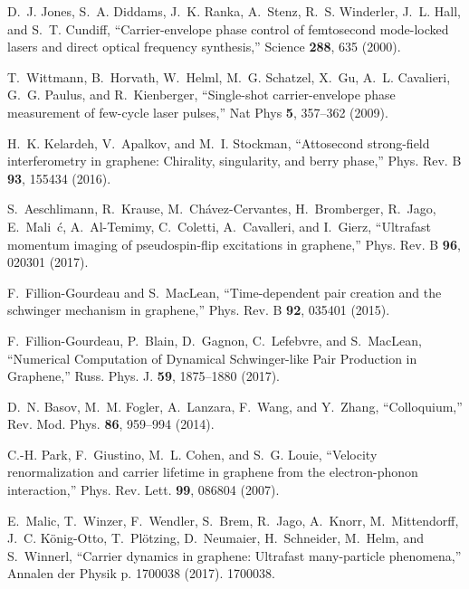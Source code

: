 \documentclass[9pt,twocolumn,twoside]{osajnl}
\begin{document}
\begin{thebibliography}{10}
D.~J. Jones, S.~A. Diddams, J.~K. Ranka, A.~Stenz, R.~S. Winderler, J.~L. Hall,
  and S.~T. Cundiff, \enquote{Carrier-envelope phase control of femtosecond
  mode-locked lasers and direct optical frequency synthesis,} Science
  \textbf{288}, 635 (2000).

T.~Wittmann, B.~Horvath, W.~Helml, M.~G. Schatzel, X.~Gu, A.~L. Cavalieri,
  G.~G. Paulus, and R.~Kienberger, \enquote{Single-shot carrier-envelope phase
  measurement of few-cycle laser pulses,} Nat Phys \textbf{5}, 357--362 (2009).

H.~K. Kelardeh, V.~Apalkov, and M.~I. Stockman, \enquote{Attosecond
  strong-field interferometry in graphene: Chirality, singularity, and berry
  phase,} Phys. Rev. B \textbf{93}, 155434 (2016).

S.~Aeschlimann, R.~Krause, M.~Ch\'avez-Cervantes, H.~Bromberger, R.~Jago,
  E.~Mali\ifmmode~\else \'{c}\fi{}, A.~Al-Temimy, C.~Coletti,
  A.~Cavalleri, and I.~Gierz, \enquote{Ultrafast momentum imaging of
  pseudospin-flip excitations in graphene,} Phys. Rev. B \textbf{96}, 020301
  (2017).

F.~Fillion-Gourdeau and S.~MacLean, \enquote{Time-dependent pair creation and
  the schwinger mechanism in graphene,} Phys. Rev. B \textbf{92}, 035401
  (2015).

F.~Fillion-Gourdeau, P.~Blain, D.~Gagnon, C.~Lefebvre, and S.~MacLean,
  \enquote{{Numerical Computation of Dynamical Schwinger-like Pair Production
  in Graphene},} Russ. Phys. J. \textbf{59}, 1875--1880 (2017).

D.~N. Basov, M.~M. Fogler, A.~Lanzara, F.~Wang, and Y.~Zhang,
  \enquote{Colloquium,} Rev. Mod. Phys. \textbf{86}, 959--994 (2014).

C.-H. Park, F.~Giustino, M.~L. Cohen, and S.~G. Louie, \enquote{Velocity
  renormalization and carrier lifetime in graphene from the electron-phonon
  interaction,} Phys. Rev. Lett. \textbf{99}, 086804 (2007).

E.~Malic, T.~Winzer, F.~Wendler, S.~Brem, R.~Jago, A.~Knorr, M.~Mittendorff,
  J.~C. K{\"o}nig-Otto, T.~Pl{\"o}tzing, D.~Neumaier, H.~Schneider, M.~Helm,
  and S.~Winnerl, \enquote{Carrier dynamics in graphene: Ultrafast
  many-particle phenomena,} Annalen der Physik p. 1700038 (2017). 1700038.


\end{thebibliography}
\end{document}
